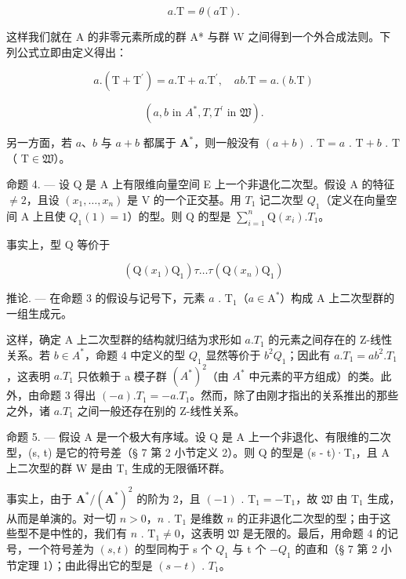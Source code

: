 \[
a. \mathrm{T} = \theta (a \mathrm{T}).\tag{3}
\]

  这样我们就在 A 的非零元素所成的群 A* 与群 W 之间得到一个外合成法则。下列公式立即由定义得出：

\[
a. (\mathrm{T} + \mathrm{T} ^ {\prime}) = a. \mathrm{T} + a. \mathrm{T} ^ {\prime}, \quad a b. \mathrm{T} = a. (b. \mathrm{T})\tag{4}
\]

\[
(a, b \text {   in   } A ^ {*}, T, T ^ {\prime} \text {   in   } \mathfrak {W}).
\]

  另一方面，若 \(a\)、\(b\) 与 \(a + b\) 都属于 \(\mathbf{A}^*\)，则一般没有 \((a + b)\) . \(\mathrm{T} = a\) . \(\mathrm{T} + b\) . \(\mathrm{T}\)（ \(\mathrm{T} \in \mathfrak{W}\)）。

命题 4. --- 设 Q 是 A 上有限维向量空间 E 上一个非退化二次型。假设 A 的特征 \(\neq 2\)，且设 \((x_{1},\ldots,x_{n})\) 是 V 的一个正交基。用 \(T_{1}\) 记二次型 \(Q_{1}\)（定义在向量空间 A 上且使 \(Q_{1}(1)=1\)）的型。则 Q 的型是 \(\sum_{i=1}^{n}\mathrm{Q}(x_{i}).T_{1}\)。

  事实上，型 Q 等价于

\[
(\mathrm{Q} (x _ {1}) \mathrm{Q} _ {1}) \tau \dots \tau (\mathrm{Q} (x _ {n}) \mathrm{Q} _ {1})
\]

推论. --- 在命题 3 的假设与记号下，元素 \(a\) . \(\mathrm{T}_{1}\)（\(a \in \mathrm{A}^{*}\)）构成 A 上二次型群的一组生成元。

  这样，确定 A 上二次型群的结构就归结为求形如 \(a.T_{1}\) 的元素之间存在的 Z-线性关系。若 \(b \in A^{*}\)，命题 4 中定义的型 \(Q_{1}\) 显然等价于 \(b^{2}Q_{1}\)；因此有 \(a.T_{1} = ab^{2}.T_{1}\)，这表明 \(a.T_{1}\) 只依赖于 a 模子群 \((A^{*})^{2}\)（由 \(A^{*}\) 中元素的平方组成）的类。此外，由命题 3 得出 \((-a).T_{1} = -a.T_{1}\)。然而，除了由刚才指出的关系推出的那些之外，诸 \(a.T_{1}\) 之间一般还存在别的 Z-线性关系。

命题 5. --- 假设 A 是一个极大有序域。设 Q 是 A 上一个非退化、有限维的二次型，(s, t) 是它的符号差（§ 7 第 2 小节定义 2）。则 Q 的型是 (s - t)·T₁，且 A 上二次型的群 W 是由 T₁ 生成的无限循环群。

  事实上，由于 \(\mathbf{A}^{*}/(\mathbf{A}^{*})^{2}\) 的阶为 2，且 \((-1)\) . \(\mathrm{T}_{1} = -\mathrm{T}_{1}\)，故 \(\mathfrak{W}\) 由 \(\mathrm{T}_{1}\) 生成，从而是单演的。对一切 \(n > 0\)，\(n\) . \(\mathrm{T}_{1}\) 是维数 \(n\) 的正非退化二次型的型；由于这些型不是中性的，我们有 \(n\) . \(\mathrm{T}_{1} \neq 0\)，这表明 \(\mathfrak{W}\) 是无限的。最后，用命题 4 的记号，一个符号差为 \((s, t)\) 的型同构于 s 个 \(Q_{1}\) 与 t 个 \(-Q_{1}\) 的直和（§ 7 第 2 小节定理 1）；由此得出它的型是 \((s - t)\) . \(T_{1}\)。

